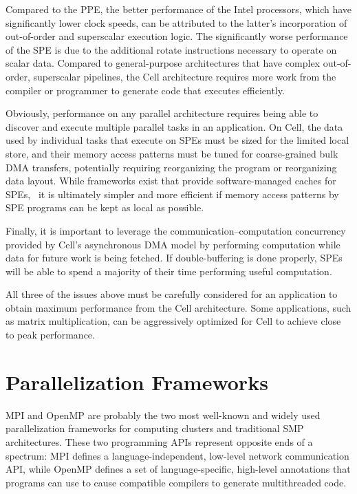 Compared to the PPE, the better performance of the Intel processors, which have significantly lower clock speeds, can be attributed to the latter's incorporation of out-of-order and superscalar execution logic. The significantly worse performance of the SPE is due to the additional rotate instructions necessary to operate on scalar data. Compared to general-purpose architectures that have complex out-of-order, superscalar pipelines, the Cell architecture requires more work from the compiler or programmer to generate code that executes efficiently.

Obviously, performance on any parallel architecture requires being able to discover and execute multiple parallel tasks in an application. On Cell, the data used by individual tasks that execute on SPEs must be sized for the limited local store, and their memory access patterns must be tuned for coarse-grained bulk DMA transfers, potentially requiring reorganizing the program or reorganizing data layout. While frameworks exist that provide software-managed caches for SPEs,~\cite{cell:website} it is ultimately simpler and more efficient if memory access patterns by SPE programs can be kept as local as possible.

Finally, it is important to leverage the communication--computation concurrency provided by Cell's asynchronous DMA model by performing computation while data for future work is being fetched. If double-buffering is done properly, SPEs will be able to spend a majority of their time performing useful computation.

All three of the issues above must be carefully considered for an application to obtain maximum performance from the Cell architecture. Some applications, such as matrix multiplication, can be aggressively optimized for Cell to achieve close to peak performance.~\cite{cell:intro}

\section{Parallelization Frameworks}

MPI and OpenMP are probably the two most well-known and widely used parallelization frameworks for computing clusters and traditional SMP architectures. These two programming APIs represent opposite ends of a spectrum: MPI defines a language-independent, low-level network communication API, while OpenMP defines a set of language-specific, high-level annotations that programs can use to cause compatible compilers to generate multithreaded code.

